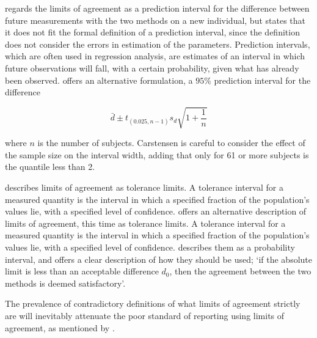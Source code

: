 \documentclass[12pt, a4paper]{report}
\theoremstyle{plain}
\theoremstyle{definition}
\theoremstyle{remark}
\begin{document}
\citet{BXC2008} regards the limits of agreement as a prediction interval for the difference between future measurements with the
two methods on a new individual, but states that it does not fit the formal definition of a prediction interval, since the definition does not consider the errors in estimation of the parameters. Prediction intervals, which are often used in regression analysis, are estimates of an interval in which future observations will fall, with a certain probability, given what has
already been observed. \citet{BXC2008} offers an alternative formulation, a $95\%$ prediction interval for the difference

\[
\bar{d} \pm t_{(0.025, n-1)}s_{d} \sqrt{1+\frac{1}{n}}
\]

\noindent where $n$ is the number of subjects. Carstensen is careful to consider the effect of the sample size on the interval
width, adding that only for 61 or more subjects is the quantile less than 2.

\citet{luiz} describes limits of agreement as tolerance limits. A
tolerance interval for a measured quantity is the interval in
which a specified fraction of the population's values lie, with a
specified level of confidence. \citet{luiz} offers an alternative description of limits of agreement, this time as tolerance limits. A tolerance interval for
a measured quantity is the interval in which a specified fraction of the population's values lie, with a specified level of
confidence. \citet{Barnhart} describes them as a probability interval, and offers a clear description of how they should be used; `if the absolute limit is less than an acceptable difference $d_{0}$, then the agreement between the two methods is deemed
satisfactory'.

The prevalence of contradictory definitions of what limits of agreement strictly are will inevitably attenuate the poor standard of reporting using limits of agreement, as mentioned by \citet{mantha}.


\end{document}
